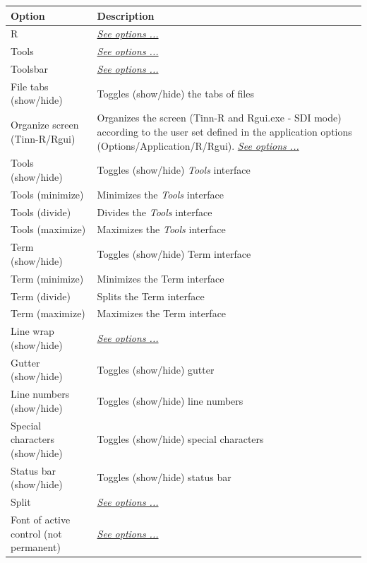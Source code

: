 \begin{scriptsize}
  \begin{tabularx}{\textwidth}{>{\hsize=0.7\hsize}X>{\hsize=0.7\hsize}X}\\
    \hline
    \textbf{Option} & \textbf{Description} \\
    \hline
    R & \textit{\href{\#menu\_view\_r}{See options ...}} \\
    Tools & \textit{\href{\#menu\_view\_tools}{See options ...}} \\
    Toolsbar & \textit{\href{\#menu\_view\_toolbars}{See options ...}} \\
    File tabs (show/hide) & Toggles (show/hide) the tabs of files \\
    \hdashline[1pt/1pt]
    Organize screen (Tinn-R/Rgui) & Organizes the screen (Tinn-R and Rgui.exe - SDI mode) according to the user set defined
     in the application options (Options/Application/R/Rgui). \textit{\href{\#working\_app\_r}{See options ...}} \\
    \hdashline[1pt/1pt]
    Tools (show/hide) & Toggles (show/hide) \textit{Tools} interface \\
    Tools (minimize) & Minimizes the \textit{Tools} interface \\
    Tools (divide) & Divides the \textit{Tools} interface \\
    Tools (maximize) & Maximizes the \textit{Tools} interface \\
    \hdashline[1pt/1pt]
    Term (show/hide) & Toggles (show/hide) Term interface \\
    Term (minimize) & Minimizes the Term interface \\
    Term (divide) & Splits the Term interface \\
    Term (maximize) & Maximizes the Term interface \\
    \hdashline[1pt/1pt]
    Line wrap (show/hide) & \textit{\href{\#menu\_view\_linewrap}{See options ...}} \\
    Gutter (show/hide) & Toggles (show/hide) gutter \\
    Line numbers (show/hide) & Toggles (show/hide) line numbers \\
    Special characters (show/hide) & Toggles (show/hide) special characters \\
    Status bar (show/hide) & Toggles (show/hide) status bar \\
    \hdashline[1pt/1pt]
    Split & \textit{\href{\#menu\_view\_split}{See options ...}} \\
    Font of active control (not permanent) & \textit{\href{\#menu\_view\_fontsize}{See options ...}} \\
    \hline
  \end{tabularx}
\end{scriptsize}


